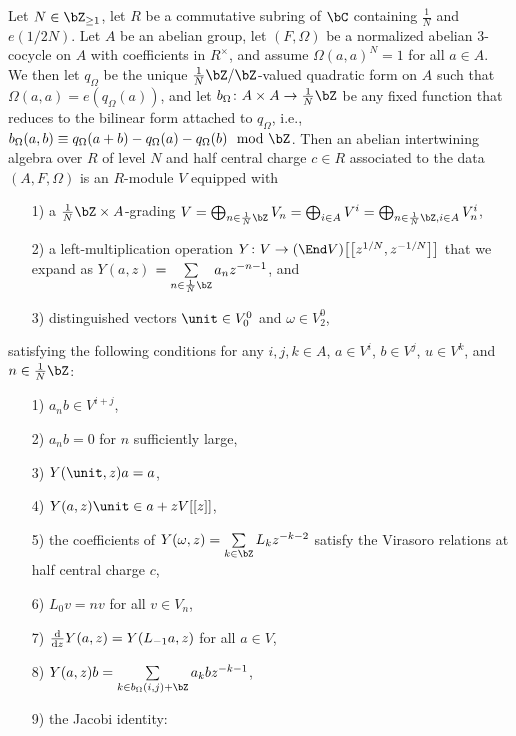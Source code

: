 \begin{defn}
Let $N \in \bZ_{\geq 1}$, let $R$ be a commutative subring of $\bC$ containing $\frac{1}{N}$ and $e(1/2N)$. Let $A$ be an abelian group, let $(F,\Omega)$ be a normalized abelian 3-cocycle on $A$ with coefficients in $R^\times$, and assume $\Omega(a,a)^N = 1$ for all $a \in A$. We then let $q_\Omega$ be the unique $\frac{1}{N}\bZ/\bZ$-valued quadratic form on $A$ such that $\Omega(a,a) = e(q_\Omega(a))$, and let $b_\Omega\colon A \times A \to \frac{1}{N}\bZ$ be any fixed function that reduces to the bilinear form attached to $q_\Omega$, i.e., $b_\Omega(a,b) \equiv q_\Omega(a+b) - q_\Omega(a) - q_\Omega(b) \mod \bZ$. Then an abelian intertwining algebra over $R$ of level $N$ and half central charge $c \in R$ associated to the data $(A, F, \Omega)$ is an $R$-module $V$ equipped with
\begin{enumerate}\itemsep=0pt
\item[1)] a $\frac{1}{N}\bZ \times A$-grading $V = \bigoplus_{n \in \frac{1}{N} \bZ} V_n = \bigoplus_{i \in A} V^i = \bigoplus_{n \in \frac{1}{N} \bZ, i \in A} V_n^i$,
\item[2)] a left-multiplication operation $Y\colon V \to (\End V)\big[\big[z^{1/N},z^{-1/N}\big]\big]$ that we expand as $Y(a,z)$ $= \sum\limits_{n \in \frac{1}{N}\bZ} a_n z^{-n-1}$, and
\item[3)] distinguished vectors $\unit \in V_0^0$ and $\omega \in V_2^0$,
\end{enumerate}
satisfying the following conditions for any $i,j,k \in A$, $a \in V^i$, $b \in V^j$, $u \in V^k$, and $n \in \frac{1}{N}\bZ$:
\begin{enumerate}\itemsep=0pt
\item[1)] $a_n b \in V^{i+j}$,
\item[2)] $a_n b = 0$ for $n$ sufficiently large,
\item[3)] $Y(\unit, z)a = a$,
\item[4)] $Y(a,z)\unit \in a + zV[[z]]$,
\item[5)] the coefficients of $Y(\omega,z) = \sum\limits_{k \in \bZ} L_k z^{-k-2}$ satisfy the Virasoro relations at half central charge $c$,
\item[6)] $L_0 v = nv$ for all $v \in V_n$,
\item[7)] $\frac{{\rm d}}{{\rm d}z} Y(a,z) = Y(L_{-1}a,z)$ for all $a \in V$,
\item[8)] $Y(a,z)b = \sum\limits_{k \in b_\Omega(i,j) + \bZ} a_k b z^{-k-1}$,
\item[9)] the Jacobi identity:

\end{enumerate}
\end{defn}
